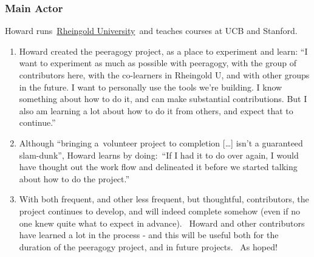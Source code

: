 \subsubsection{Main Actor}

Howard runs~\href{http://www.rheingold.com/university/}{Rheingold
University}~and teaches courses at UCB and Stanford.

\begin{enumerate}
\item
  Howard created the peeragogy project, as a place to experiment and
  learn: ``I want to experiment as much as possible with peeragogy, with
  the group of contributors here, with the co-learners in Rheingold U,
  and with other groups in the future. I want to personally use the
  tools we're building. I know something about how to do it, and can
  make substantial contributions. But I also am learning a lot about how
  to do it from others, and expect that to continue.''
\item
  Although ``bringing a~volunteer project to completion {[}\ldots{}{]}
  isn't a guaranteed slam-dunk'', Howard learns by doing:~``If I had it
  to do over again, I would have thought out the work flow and
  delineated it before we started talking about how to do the project.''
\item
  With both frequent, and other less frequent, but thoughtful,
  contributors, the project continues to develop, and will indeed
  complete somehow (even if no one knew quite what to expect in
  advance).~ Howard and other contributors have learned a lot in the
  process - and this will be useful both for the duration of the
  peeragogy project, and in future projects.~ As hoped!
\end{enumerate}
